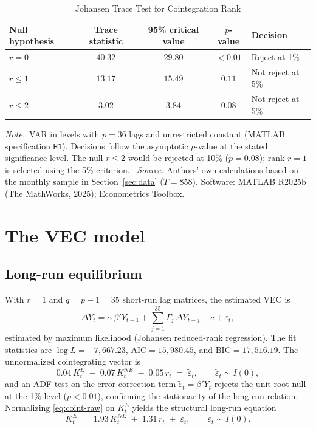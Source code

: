 \documentclass[ecta,nameyear,final,supplement]{econsocart}
\numberwithin{equation}{section}
\numberwithin{table}{section}
\theoremstyle{definition}
\newcommand{\KE}{K^{E}}
\newcommand{\KNE}{K^{NE}}
\newcommand{\tabnote}{\par\addvspace{0.4em}\noindent\emph{Note.}}
\newcommand{\tabsource}{\ \textit{Source:} Authors' own calculations based on
the monthly sample in Section~\ref{sec:data} ($T=858$). Software: MATLAB
R2025b (The MathWorks, 2025); Econometrics Toolbox.}
\begin{document}
\begin{table}[H]
\centering
\caption{Johansen Trace Test for Cointegration Rank}
\label{tab:johansen}
\begin{tabular}{lcccl}
\toprule
Null hypothesis & Trace statistic & 95\% critical value & $p$-value &
Decision \\
\midrule
$r=0$     & $40.32$ & $29.80$ & $<0.01$ & Reject at 1\% \\
$r\le 1$  & $13.17$ & $15.49$ & $0.11$  & Not reject at 5\% \\
$r\le 2$  & $3.02$  & $3.84$  & $0.08$  & Not reject at 5\% \\
\bottomrule
\end{tabular}
\tabnote\ VAR in levels with $p=36$ lags and unrestricted constant
(MATLAB specification \texttt{H1}). Decisions follow the asymptotic
$p$-value at the stated significance level. The null $r\le 2$ would be
rejected at 10\% ($p=0.08$); rank $r=1$ is selected using the 5\%
criterion.
\tabsource
\end{table}

\section{The VEC model}
\label{sec:vec}

\subsection{Long-run equilibrium}

With $r=1$ and $q=p-1=35$ short-run lag matrices, the estimated VEC is
\begin{equation}
\Delta Y_t = \alpha\,\beta' Y_{t-1}
 + \sum_{j=1}^{35}\Gamma_j\,\Delta Y_{t-j} + c + \varepsilon_t ,
\label{eq:vec-general}
\end{equation}
estimated by maximum likelihood (Johansen reduced-rank regression). The fit
statistics are $\log L = -7{,}667.23$, $\mathrm{AIC} = 15{,}980.45$, and
$\mathrm{BIC} = 17{,}516.19$. The unnormalized cointegrating vector is
\begin{equation}
0.04\,\KE_t \;-\; 0.07\,\KNE_t \;-\; 0.05\,r_t
 \;=\; \tilde\varepsilon_t ,
\qquad \tilde\varepsilon_t \sim I(0),
\label{eq:coint-raw}
\end{equation}
and an ADF test on the error-correction term
$\tilde\varepsilon_t = \beta' Y_t$ rejects the unit-root null at the 1\%
level ($p<0.01$), confirming the stationarity of the long-run relation.
Normalizing \eqref{eq:coint-raw} on $\KE_t$ yields the structural long-run
equation
\begin{equation}
\KE_t \;=\; 1.93\,\KNE_t \;+\; 1.31\,r_t \;+\; \varepsilon_t ,
\qquad \varepsilon_t \sim I(0).
\label{eq:coint-normalized}
\end{equation}
\end{document}
